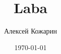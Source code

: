\documentclass[a4paper,12pt]{article}
\title{Laba}
\author{Алексей Кожарин}
\date{\today}
\begin{document}

\renewcommand{\baselinestretch}{1.3}





%
%
\end{document}
